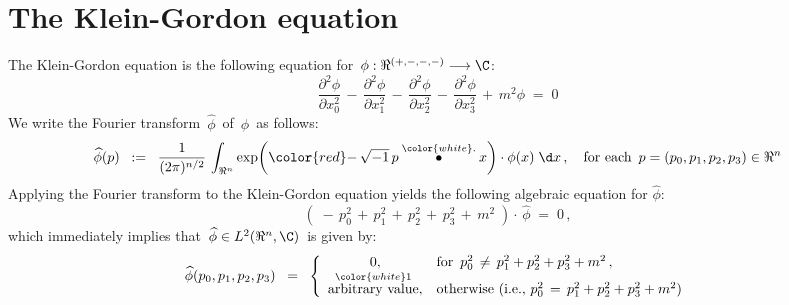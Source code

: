 
\vskip 1.0cm
\section{The Klein-Gordon equation}

\noindent
The Klein-Gordon equation is the following equation
for \,$\phi : \Re^{(+,-,-,-)} \longrightarrow \C$:
\begin{equation*}
\dfrac{\partial^{2}\phi}{\partial x_{0}^{2}}
\,-\,
\dfrac{\partial^{2}\phi}{\partial x_{1}^{2}}
\,-\,
\dfrac{\partial^{2}\phi}{\partial x_{2}^{2}}
\,-\,
\dfrac{\partial^{2}\phi}{\partial x_{3}^{2}}
\,+\,
m^{2}\phi
\; = \;
0
\end{equation*}
We write the Fourier transform \,$\widehat{\phi}$\, of \,$\phi$\, as follows:
\begin{equation*}
\widehat{\phi}(p)
\;\; := \;\;
	\dfrac{1}{(2\pi)^{n/2}}\,
	\int_{\Re^{n}}
		\exp\!\left({\color{red}-}\,\sqrt{-1}\, p \overset{{\color{white}.}}{\bullet} x\right) \cdot \phi(x)
		\;\d x\,,
\quad
\textnormal{for each \,$p = (p_{0},p_{1},p_{2},p_{3}) \in \Re^{n}$}
\end{equation*}
Applying the Fourier transform to the Klein-Gordon equation yields
the following algebraic equation for $\widehat{\phi}$:
\begin{equation*}
\left(\;
	-\,
	p_{0}^{2}
	\,+\,
	p_{1}^{2}
	\,+\,
	p_{2}^{2}
	\,+\,
	p_{3}^{2}
	\,+\,
	m^{2}
	\;\right)
	\cdot\,\widehat{\phi}
\; = \;
	0\,,
\end{equation*}
which immediately implies that \,$\widehat{\phi} \in L^{2}(\Re^{n},\C)$\, is given by:
\begin{equation*}
\widehat{\phi}(p_{0},p_{1},p_{2},p_{3})
\;\; = \;\;
	\left\{\begin{array}{cl}
		0, & \textnormal{for \,$p_{0}^{2} \,\neq\, p_{1}^{2} + p_{2}^{2} + p_{3}^{2} + m^{2}$}\,,
		\\
		\overset{{\color{white}1}}{\textnormal{arbitrary value}}, & \textnormal{otherwise (i.e., $p_{0}^{2} \,=\, p_{1}^{2} + p_{2}^{2} + p_{3}^{2} + m^{2}$)}
		\end{array}\right.
\end{equation*}


